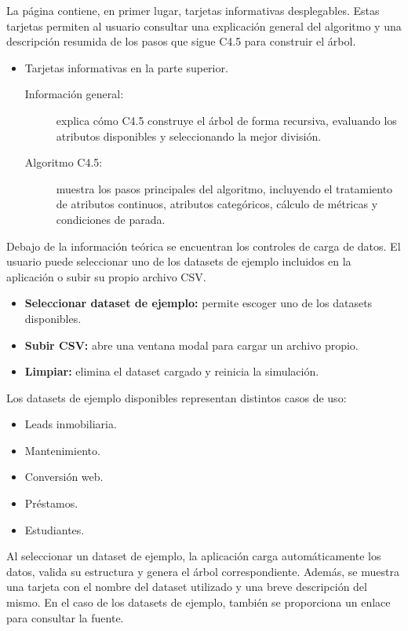 La página contiene, en primer lugar, tarjetas informativas desplegables. Estas tarjetas permiten al usuario consultar una explicación general del algoritmo y una descripción resumida de los pasos que sigue C4.5 para construir el árbol.

\begin{itemize}
    \item Tarjetas informativas en la parte superior.
    \begin{description}
        \item[Información general:] explica cómo C4.5 construye el árbol de forma recursiva, evaluando los atributos disponibles y seleccionando la mejor división.
        \item[Algoritmo C4.5:] muestra los pasos principales del algoritmo, incluyendo el tratamiento de atributos continuos, atributos categóricos, cálculo de métricas y condiciones de parada.
    \end{description}
\end{itemize}

Debajo de la información teórica se encuentran los controles de carga de datos. El usuario puede seleccionar uno de los datasets de ejemplo incluidos en la aplicación o subir su propio archivo CSV.

\begin{itemize}
    \item \textbf{Seleccionar dataset de ejemplo:} permite escoger uno de los datasets disponibles.
    \item \textbf{Subir CSV:} abre una ventana modal para cargar un archivo propio.
    \item \textbf{Limpiar:} elimina el dataset cargado y reinicia la simulación.
\end{itemize}

Los datasets de ejemplo disponibles representan distintos casos de uso:

\begin{itemize}
    \item Leads inmobiliaria.
    \item Mantenimiento.
    \item Conversión web.
    \item Préstamos.
    \item Estudiantes.
\end{itemize}

Al seleccionar un dataset de ejemplo, la aplicación carga automáticamente los datos, valida su estructura y genera el árbol correspondiente. Además, se muestra una tarjeta con el nombre del dataset utilizado y una breve descripción del mismo. En el caso de los datasets de ejemplo, también se proporciona un enlace para consultar la fuente.

